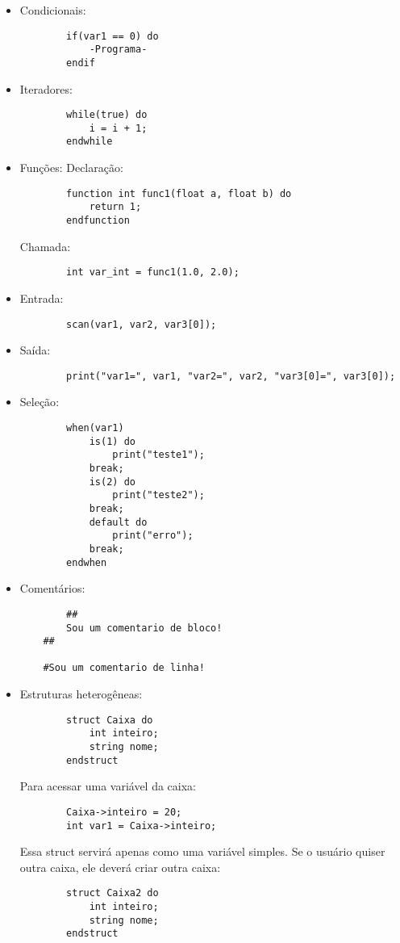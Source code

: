 \begin{itemize}
\item{Condicionais}: 
	\begin{lstlisting}
		if(var1 == 0) do
        	-Programa-
		endif
	\end{lstlisting}
    
\item{Iteradores}: 
	\begin{lstlisting}
		while(true) do
        	i = i + 1;
		endwhile
	\end{lstlisting}

\item{Funções}: 
	Declaração:
	\begin{lstlisting}
		function int func1(float a, float b) do
        	return 1;
		endfunction
	\end{lstlisting}
    
    Chamada:
    \begin{lstlisting}
		int var_int = func1(1.0, 2.0);
	\end{lstlisting}
    
\item{Entrada}: 
	\begin{lstlisting}
		scan(var1, var2, var3[0]);
	\end{lstlisting}
    
\item{Saída}: 
	\begin{lstlisting}
		print("var1=", var1, "var2=", var2, "var3[0]=", var3[0]);
	\end{lstlisting}
    
\item{Seleção}: 
	\begin{lstlisting}
		when(var1)
			is(1) do
				print("teste1");
			break;
			is(2) do
				print("teste2");
			break;
			default do
				print("erro");
			break;
		endwhen
	\end{lstlisting}
    
\item{Comentários}: 
	\begin{lstlisting}
		##
      	Sou um comentario de bloco!
    ##
        
    #Sou um comentario de linha!
	\end{lstlisting}
    
\item{Estruturas heterogêneas}: 
	\begin{lstlisting}
		struct Caixa do
			int inteiro;
			string nome;
		endstruct
	\end{lstlisting}
    Para acessar uma variável da caixa:
    \begin{lstlisting}
    	Caixa->inteiro = 20;
		int var1 = Caixa->inteiro;
	\end{lstlisting}
    Essa struct servirá apenas como uma variável simples. Se o usuário quiser outra caixa, ele deverá criar outra caixa:
    \begin{lstlisting}
		struct Caixa2 do
			int inteiro;
			string nome;
		endstruct
	\end{lstlisting}
\end{itemize}
